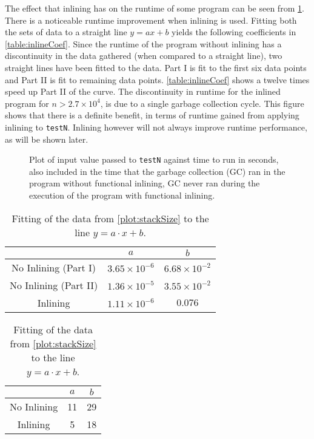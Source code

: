 \documentclass[float=false, crop=false]{standalone}
\newlength\gwidth
\newlength\gheight
\newcommand{\importMGraph}[3]{\setlength{\gwidth}{#2}\setlength{\gheight}{#3}{#1}}
\begin{document}
The effect that inlining has on the runtime of some program can be seen from
\cref{plot:inlinePlot}. 
 There is a noticeable runtime improvement when inlining is used.
Fitting both the sets of data to a straight line $y=ax+b$ yields the following
coefficients in \cref{table:inlineCoef}. Since the runtime of the program without inlining
has a discontinuity in the data gathered (when compared to a straight line), two straight lines have been
fitted to the data. Part I is fit to the first six data points and Part II is fit to remaining data points.
\cref{table:inlineCoef} shows a twelve times speed up Part II of the curve.
  The discontinuity in runtime for the inlined program for $n > 2.7 \times 10^{4}$, 
  is due to a single garbage collection cycle.
  This figure shows that there is a definite benefit, 
  in terms of runtime gained from applying inlining to \texttt{testN}. Inlining however
  will not always improve runtime performance, as will be shown later. 
\begin{figure}
\begin{samepage}
  \centering
  \importMGraph{inlinePlotComplex}{0.96\textwidth}{0.4\textwidth}
  \caption[Runtime of \texttt{testN} as a function on input size $n$]
  {Plot of input value passed to \texttt{testN} against time to run in seconds,
    also included in the time that the garbage collection (GC) ran in the program 
    without functional inlining, GC never ran during the execution of the 
    program with functional inlining.}
  \label{plot:inlinePlot}
\end{samepage}
\end{figure}

\begin{table}
  \centering
  \begin{minipage}{0.55\textwidth}
    \centering
\begin{tabular}{c | c  c}
  & $a$ & $b$\\
  \hline 
  No Inlining (Part I) & $3.65\times 10^{-6}$ & $6.68 \times 10^{-2}$\\
  No Inlining (Part II) & $1.36\times 10^{-5}$ & $3.55 \times 10^{-2}$\\
  Inlining & $1.11\times 10^{-6}$ & $0.076$
\end{tabular}
\caption{Coefficients from fitting the data in \cref{plot:inlinePlot} to 
  a straight line $y=ax+b$}
  \label{table:inlineCoef}
\end{minipage}\hfill
\begin{minipage}{0.4\textwidth}
  \centering
  \begin{tabular}{ c | c c}
  & $a$ & $b$\\
  \hline
  No Inlining & 11 & 29 \\
  Inlining & 5 & 18 
  \end{tabular}
  \caption{Fitting of the data from \cref{plot:stackSize}  
    to the line $y = a\cdot x + b$.}
  \label{table:stackGrowth}
\end{minipage}
\end{table}
\end{document}
